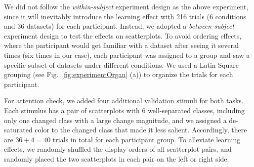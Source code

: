 {\vspace{.3em}
We did not follow the \emph{within-subject}  experiment design as the above experiment, since it will inevitably introduce the learning effect with 216 trials (6 conditions and 36 datasets) for each participant.
Instead, we adopted  a \emph{between-subject} experiment design to test the effects on scatterplots.
To avoid ordering effects, where the participant would get familiar with a dataset after seeing it several times (six times in our case), each participant was assigned to a group and saw a specific subset of datasets under different conditions. We used a Latin Square grouping (see Fig.~\ref{fig:experimentOrgan} (a)) to organize the trials for each participant. %

For attention check, we added four additional validation stimuli for both tasks. Each stimulus has a pair of scatterplots with 6 well-separated classes, including only one changed class with a large change magnitude, and we assigned a de-saturated color to the changed class that made it less salient. Accordingly, there are $36+4 = 40$ trials in total for each participant group. To alleviate learning effects, we randomly shuffled the display orders of all scatterplot pairs, and randomly placed the two scatterplots in each pair on the left or right side.




}
